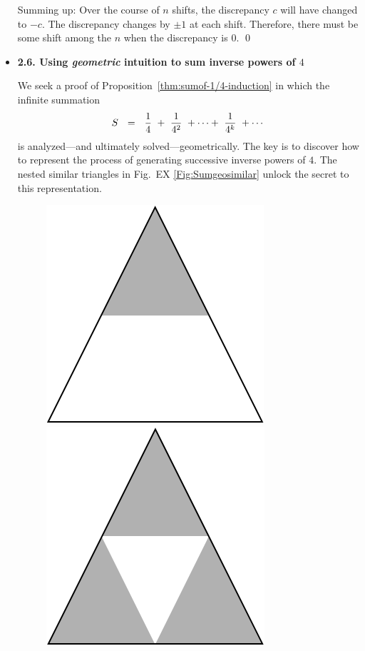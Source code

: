 \begin{itemize}
\smallskip

Summing up: Over the course of $n$ shifts, the discrepancy $c$ will have changed to $-c$.  The  discrepancy changes by $\pm 1$ at each shift.  Therefore, there must be some shift among the $n$ when the discrepancy is $0$.  \qed
 

\medskip \item
{\bf 2.6. Using {\em geometric} intuition to sum inverse powers of $4$}

\smallskip

We seek a proof of Proposition~\ref{thm:sumof-1/4-induction} in which the infinite summation
\[ S \ \ = \ \  {1 \over 4} \ + \  {1 \over 4^2} \ + \cdots + \ {1 \over 4^k} \ + \cdots  \]
is analyzed---and ultimately solved---geometrically.  The key is to discover how to represent the process of generating successive inverse powers of $4$.  The nested similar triangles in Fig.~EX \ref {Fig:Sumgeosimilar} unlock the secret to this representation.
\begin{figure}[ht]
\begin{center}
        \includegraphics[scale=0.3]{FiguresMaths/Sum1over4topTriangle}
        \hspace{1cm}
        \includegraphics[scale=0.3]{FiguresMaths/Sum1over4similarTriangles}

\end{center}
\end{figure}
\end{itemize}
